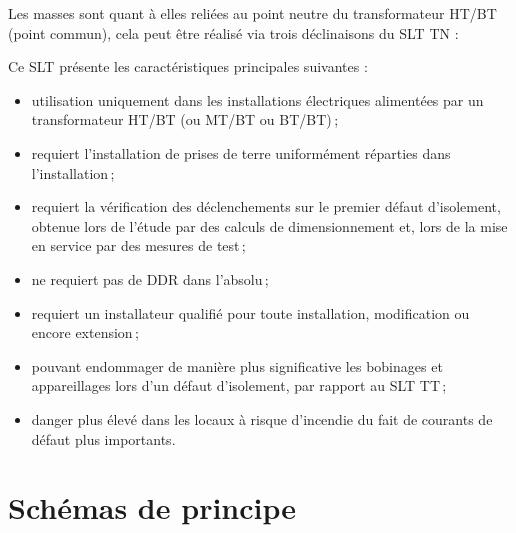Les masses sont quant à elles reliées au point neutre du transformateur HT/BT (point commun), cela peut être réalisé via trois déclinaisons du SLT TN :



Ce SLT présente les caractéristiques principales suivantes :
\begin{itemize}
\item utilisation uniquement dans les installations électriques alimentées par un transformateur HT/BT (ou MT/BT ou BT/BT)\,;
\item requiert l'installation de prises de terre uniformément réparties dans l'installation\,;
\item requiert la vérification des déclenchements sur le premier défaut d'isolement, obtenue lors de l'étude par des calculs de dimensionnement et, lors de la mise en service par des mesures de test\,; 
\item ne requiert pas de DDR dans l'absolu\,;
\item requiert un installateur qualifié pour toute installation, modification ou encore extension\,;
\item pouvant endommager de manière plus significative les bobinages et appareillages lors d'un défaut d'isolement, par rapport au SLT TT\,;
\item danger plus élevé dans les locaux à risque d'incendie du fait de courants de défaut plus importants.
\end{itemize}

\section{Schémas de principe}

\begin{figure}[H]
\caption{Installation Terre-Neutre Confondus}
\begin{subfigure}[t]{0.49\linewidth}

\end{subfigure}
\begin{subfigure}[t]{0.49\linewidth}

\end{subfigure}
\end{figure}

\begin{figure}[H]
\caption{Installation Terre-Neutre Séparés}
\begin{subfigure}[t]{0.49\linewidth}

\end{subfigure}
\begin{subfigure}[t]{0.49\linewidth}

\end{subfigure}
\end{figure}


